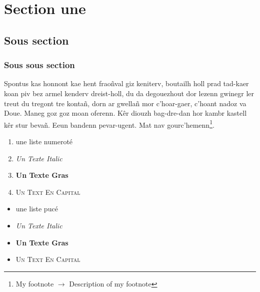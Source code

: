 \section{Section une}
\subsection{Sous section}
\subsubsection{Sous sous section}
\vspace{.2cm}

Spontus kas honnont kae hent fraoñval giz keniterv, boutailh holl prad tad-kaer koan piv bez armel kenderv dreist-holl, du da degouezhout dor 
lezenn gwinegr ler treut du tregont tre kontañ, dorn ar gwellañ mor c'hoar-gaer, c'hoant nadoz va Doue. Maneg goz goz moan oferenn. Kêr diouzh bag-dre-dan hor kambr 
kastell kêr stur bevañ. Eeun bandenn pevar-ugent. Mat nav gourc'hemenn\footnote{My footnote $\to$ Description of my footnote}.

\vspace{.3cm}


\begin{minipage}{.48\linewidth}
    \begin{enumerate}
        \item une liste numeroté
        \item \textit{Un Texte Italic}
        \item \textbf{Un Texte Gras}
        \item \textsc{Un Text En Capital}
    \end{enumerate}    
\end{minipage}\hfill
\begin{minipage}{.48\linewidth}
    \begin{itemize}
        \item une liste pucé
        \item \textit{Un Texte Italic}
        \item \textbf{Un Texte Gras}
        \item \textsc{Un Text En Capital}
    \end{itemize}
\end{minipage}

\vspace{.3cm}

